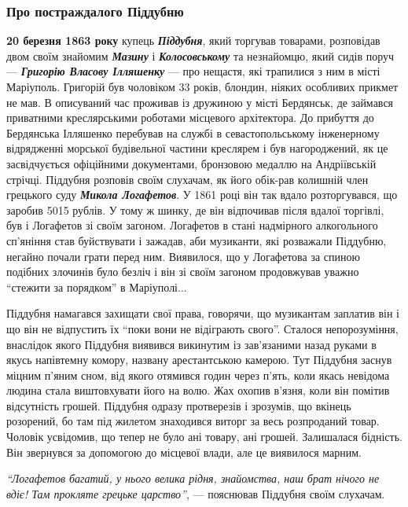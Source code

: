 \subsubsection{Про постраждалого Піддубню}

\textbf{20 березня 1863 року} купець \emph{\textbf{Піддубня}}, який торгував товарами, розповідав двом
своїм знайомим \emph{\textbf{Мазину}} і \emph{\textbf{Колосовському}} та незнайомцю, який сидів поруч —
\emph{\textbf{Григорію Власову Ілляшенку}} — про нещастя, які трапилися з ним в місті
Маріуполь. Григорій був чоловіком 33 років, блондин, ніяких особливих прикмет
не мав. В описуваний час проживав із дружиною у місті Бердянськ, де займався
приватними креслярськими роботами місцевого архітектора. До прибуття до
Бердянська Ілляшенко перебував на службі в севастопольському інженерному
відрядженні морської будівельної частини креслярем і був нагороджений, як це
засвідчується офіційними документами, бронзовою медаллю на Андріївській
стрічці. Піддубня розповів своїм слухачам, як його обік\hyp{}рав колишній член
грецького суду \emph{\textbf{Микола Логафетов}}. У 1861 році він так вдало розторгувався, що
заробив 5015 рублів. У тому ж шинку, де він відпочивав після вдалої торгівлі,
був і Логафетов зі своїм загоном. Логафетов в стані надмірного алкогольного
сп'яніння став буйствувати і зажадав, аби музиканти, які розважали Піддубню,
негайно почали грати перед ним. Виявилося, що у Логафетова за спиною подібних
злочинів було безліч і він зі своїм загоном продовжував уважно \enquote{стежити за
порядком} в Маріуполі... 


Піддубня намагався захищати свої права, говорячи, що музикантам заплатив він і
що він не відпустить їх \enquote{поки вони не відіграють свого}. Сталося непорозуміння,
внаслідок якого Піддубня виявився викинутим із зав'язаними назад руками в якусь
напівтемну комору, названу арестантською камерою. Тут Піддубня заснув міцним
п'яним сном, від якого отямився годин через п'ять, коли якась невідома людина
стала виштовхувати його на волю. Жах охопив в'язня, коли він помітив
відсутність грошей. Піддубня одразу протверезів і зрозумів, що вкінець
розорений, бо там під жилетом знаходився виторг за весь розпроданий товар.
Чоловік усвідомив, що тепер не було ані товару, ані грошей. Залишалася
бідність. Він звернувся за допомогою до місцевої влади, але це виявилося
марним.

\begin{leftbar}
\emph{\enquote{Логафетов багатий, у нього велика рідня, знайомства, наш брат нічого не вдіє!
Там прокляте грецьке царство}}, — пояснював Піддубня своїм слухачам. 
\end{leftbar}

